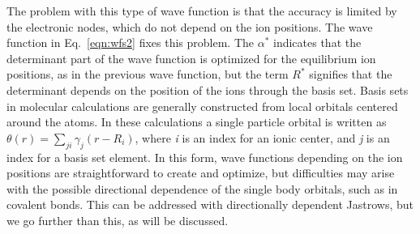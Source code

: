 \documentclass[aip,jcp,numerical,reprint]{revtex4-1}
\begin{document}
The problem with this type of wave function is that the accuracy is limited by the electronic nodes, which do not depend on the ion positions.
The wave function in Eq.~\eqref{eqn:wfs2} fixes this problem.  
The $\alpha^{*}$ indicates that the determinant part of the wave function is optimized for the equilibrium ion positions, as in the previous wave function, but the term $R^{*}$ signifies that the determinant  depends on the position of the ions through the basis set.  Basis sets in molecular calculations are generally constructed from local orbitals centered around the atoms.  In these calculations a single particle orbital is written as $\theta(r) = \sum_{ji}\gamma_{j}(r-R_{i})$, where \textit{i} is an index for an ionic center, and \textit{j} is an index for a basis set element.  
In this form, wave functions depending on the ion positions are straightforward to create and optimize,
but difficulties may arise with the possible directional dependence of the single body orbitals, such as in covalent bonds. This can be addressed with directionally dependent Jastrows, but we go further than this, as will be discussed.  
\end{document}
